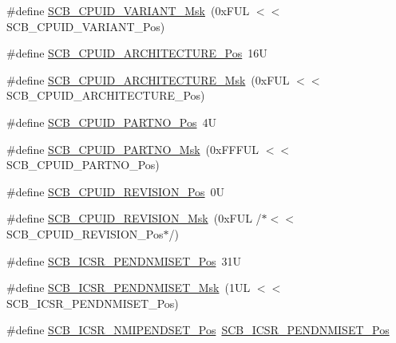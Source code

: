 \begin{DoxyCompactItemize}
\#define \mbox{\hyperlink{group___c_m_s_i_s___s_c_b_gad358dfbd04300afc1824329d128b99e8}{S\+C\+B\+\_\+\+C\+P\+U\+I\+D\+\_\+\+V\+A\+R\+I\+A\+N\+T\+\_\+\+Msk}}~(0x\+F\+U\+L $<$$<$ S\+C\+B\+\_\+\+C\+P\+U\+I\+D\+\_\+\+V\+A\+R\+I\+A\+N\+T\+\_\+\+Pos)
\item 
\#define \mbox{\hyperlink{group___c_m_s_i_s___s_c_b_gaf8b3236b08fb8e840efb682645fb0e98}{S\+C\+B\+\_\+\+C\+P\+U\+I\+D\+\_\+\+A\+R\+C\+H\+I\+T\+E\+C\+T\+U\+R\+E\+\_\+\+Pos}}~16U
\item 
\#define \mbox{\hyperlink{group___c_m_s_i_s___s_c_b_gafae4a1f27a927338ae9dc51a0e146213}{S\+C\+B\+\_\+\+C\+P\+U\+I\+D\+\_\+\+A\+R\+C\+H\+I\+T\+E\+C\+T\+U\+R\+E\+\_\+\+Msk}}~(0x\+F\+U\+L $<$$<$ S\+C\+B\+\_\+\+C\+P\+U\+I\+D\+\_\+\+A\+R\+C\+H\+I\+T\+E\+C\+T\+U\+R\+E\+\_\+\+Pos)
\item 
\#define \mbox{\hyperlink{group___c_m_s_i_s___s_c_b_ga705f68eaa9afb042ca2407dc4e4629ac}{S\+C\+B\+\_\+\+C\+P\+U\+I\+D\+\_\+\+P\+A\+R\+T\+N\+O\+\_\+\+Pos}}~4U
\item 
\#define \mbox{\hyperlink{group___c_m_s_i_s___s_c_b_ga98e581423ca016680c238c469aba546d}{S\+C\+B\+\_\+\+C\+P\+U\+I\+D\+\_\+\+P\+A\+R\+T\+N\+O\+\_\+\+Msk}}~(0x\+F\+F\+F\+U\+L $<$$<$ S\+C\+B\+\_\+\+C\+P\+U\+I\+D\+\_\+\+P\+A\+R\+T\+N\+O\+\_\+\+Pos)
\item 
\#define \mbox{\hyperlink{group___c_m_s_i_s___s_c_b_ga3c3d9071e574de11fb27ba57034838b1}{S\+C\+B\+\_\+\+C\+P\+U\+I\+D\+\_\+\+R\+E\+V\+I\+S\+I\+O\+N\+\_\+\+Pos}}~0U
\item 
\#define \mbox{\hyperlink{group___c_m_s_i_s___s_c_b_ga2ec0448b6483f77e7f5d08b4b81d85df}{S\+C\+B\+\_\+\+C\+P\+U\+I\+D\+\_\+\+R\+E\+V\+I\+S\+I\+O\+N\+\_\+\+Msk}}~(0x\+F\+U\+L /$\ast$$<$$<$ S\+C\+B\+\_\+\+C\+P\+U\+I\+D\+\_\+\+R\+E\+V\+I\+S\+I\+O\+N\+\_\+\+Pos$\ast$/)
\item 
\#define \mbox{\hyperlink{group___c_m_s_i_s___s_c_b_gac180386fac3a5701e6060084dacd003a}{S\+C\+B\+\_\+\+I\+C\+S\+R\+\_\+\+P\+E\+N\+D\+N\+M\+I\+S\+E\+T\+\_\+\+Pos}}~31U
\item 
\#define \mbox{\hyperlink{group___c_m_s_i_s___s_c_b_gadb4dbf66078026dedc24e8cb9a21b2b1}{S\+C\+B\+\_\+\+I\+C\+S\+R\+\_\+\+P\+E\+N\+D\+N\+M\+I\+S\+E\+T\+\_\+\+Msk}}~(1\+U\+L $<$$<$ S\+C\+B\+\_\+\+I\+C\+S\+R\+\_\+\+P\+E\+N\+D\+N\+M\+I\+S\+E\+T\+\_\+\+Pos)
\item 
\#define \mbox{\hyperlink{group___c_m_s_i_s___s_c_b_ga750d4b52624a46d71356db4ea769573b}{S\+C\+B\+\_\+\+I\+C\+S\+R\+\_\+\+N\+M\+I\+P\+E\+N\+D\+S\+E\+T\+\_\+\+Pos}}~\mbox{\hyperlink{group___c_m_s_i_s___s_c_b_gac180386fac3a5701e6060084dacd003a}{S\+C\+B\+\_\+\+I\+C\+S\+R\+\_\+\+P\+E\+N\+D\+N\+M\+I\+S\+E\+T\+\_\+\+Pos}}

\end{DoxyCompactItemize}
